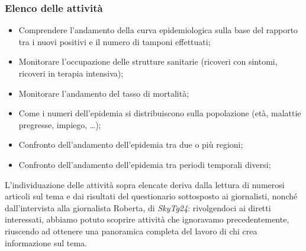 \subsubsection{Elenco delle attività}
\begin{itemize}
    \item Comprendere l'andamento della curva epidemiologica sulla base del rapporto tra i nuovi positivi e il numero di tamponi effettuati;
    \item Monitorare l'occupazione delle strutture sanitarie (ricoveri con sintomi, ricoveri in terapia intensiva);
    \item Monitorare l'andamento del tasso di mortalità;
    \item Come i numeri dell'epidemia si distribuiscono sulla popolazione (età, malattie pregresse, impiego, …);
    \item Confronto dell'andamento dell'epidemia tra due o più regioni;
    \item Confronto dell'andamento dell'epidemia tra periodi temporali diversi;
\end{itemize}

L'individuazione delle attività sopra elencate deriva dalla lettura di numerosi articoli sul tema e dai risultati del questionario sottosposto ai giornalisti, nonché dall'intervista alla giornalista Roberta, di \textit{SkyTg24}: rivolgendoci ai diretti interessati, abbiamo potuto scoprire attività che ignoravamo precedentemente, riuscendo ad ottenere una panoramica completa del lavoro di chi crea informazione sul tema.

